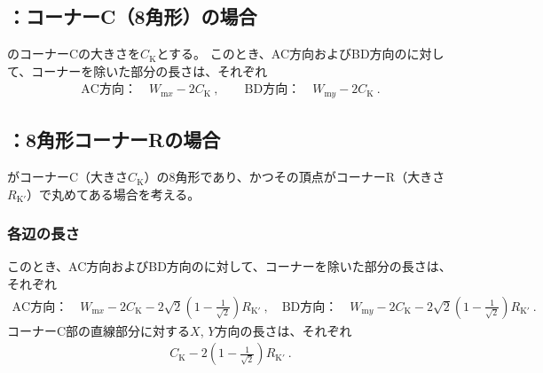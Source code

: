 \subsection{\Keyway：コーナーC（8角形）の場合}
\Keyway のコーナーCの大きさを$C_\mathrm K$とする。
このとき、AC方向およびBD方向の\KeywayWidth に対して、コーナーを除いた部分の長さは、それぞれ
\begin{align*}
  \text{AC方向：}\quad W_{\mathrm mx}-2C_\mathrm K~, \qquad
  \text{BD方向：}\quad W_{\mathrm my}-2C_\mathrm K\ .
\end{align*}


\subsection{\Keyway：8角形コーナーRの場合}
\Keyway がコーナーC（大きさ$C_\mathrm K$）の8角形であり、かつその頂点がコーナーR（大きさ$R_\mathrm{K'}$）で丸めてある場合を考える。

\subsubsection{各辺の長さ}
このとき、AC方向およびBD方向の\KeywayWidth に対して、コーナーを除いた部分の長さは、それぞれ
\begin{align*}
  \text{AC方向：}\quad W_{\mathrm mx}-2C_\mathrm K-2\sqrt2\left(1-\frac1{\sqrt2}\right)R_\mathrm{K'}~, \quad
  \text{BD方向：}\quad W_{\mathrm my}-2C_\mathrm K-2\sqrt2\left(1-\frac1{\sqrt2}\right)R_\mathrm{K'}\ .
\end{align*}
コーナーC部の直線部分に対する$X$, $Y$方向の長さは、それぞれ
\begin{align*}
  C_\mathrm K-2\left(1-\frac1{\sqrt2}\right)R_\mathrm{K'}\ .
\end{align*}

